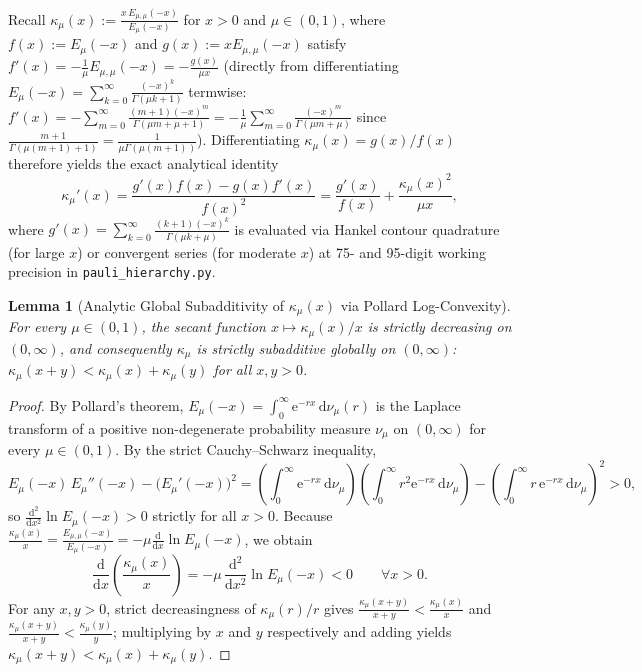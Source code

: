 \documentclass[onecolumn,10pt,notitlepage,amsmath,amssymb,floatfix]{revtex4-2}
\theoremstyle{plain}
\newtheorem{lemma}[theorem]{Lemma}
\theoremstyle{definition}
\newcommand{\dd}{\mathrm{d}}
\newcommand{\ee}{\mathrm{e}}
\begin{document}
Recall $\kappa_\mu(x) := \frac{x\,E_{\mu,\mu}(-x)}{E_\mu(-x)}$ for $x > 0$ and $\mu \in (0,1)$, where $f(x) := E_\mu(-x)$ and $g(x) := x E_{\mu,\mu}(-x)$ satisfy $f'(x) = -\frac{1}{\mu} E_{\mu,\mu}(-x) = -\frac{g(x)}{\mu x}$ (directly from differentiating $E_\mu(-x) = \sum_{k=0}^\infty \frac{(-x)^k}{\Gamma(\mu k+1)}$ termwise: $f'(x) = -\sum_{m=0}^\infty \frac{(m+1)(-x)^m}{\Gamma(\mu m + \mu + 1)} = -\frac{1}{\mu}\sum_{m=0}^\infty \frac{(-x)^m}{\Gamma(\mu m+\mu)}$ since $\frac{m+1}{\Gamma(\mu(m+1)+1)} = \frac{1}{\mu\Gamma(\mu(m+1))}$). Differentiating $\kappa_\mu(x) = g(x)/f(x)$ therefore yields the exact analytical identity
\begin{equation}
\label{eq:S4_kappa_prime}
\kappa_\mu'(x)
= \frac{g'(x)f(x) - g(x)f'(x)}{f(x)^2}
= \frac{g'(x)}{f(x)} + \frac{\kappa_\mu(x)^2}{\mu x},
\end{equation}
where $g'(x) = \sum_{k=0}^\infty \frac{(k+1)(-x)^k}{\Gamma(\mu k + \mu)}$ is evaluated via Hankel contour quadrature (for large $x$) or convergent series (for moderate $x$) at 75- and 95-digit working precision in \texttt{pauli\_hierarchy.py}.

\begin{lemma}[Analytic Global Subadditivity of $\kappa_\mu(x)$ via Pollard Log-Convexity]
\label{lem:S4_pollard_subadd}
For every $\mu \in (0,1)$, the secant function $x \mapsto \kappa_\mu(x)/x$ is strictly decreasing on $(0,\infty)$, and consequently $\kappa_\mu$ is strictly subadditive globally on $(0,\infty)$: $\kappa_\mu(x + y) < \kappa_\mu(x) + \kappa_\mu(y)$ for all $x, y > 0$.
\end{lemma}
\begin{proof}
By Pollard's theorem, $E_\mu(-x) = \int_0^\infty \ee^{-rx}\,\dd\nu_\mu(r)$ is the Laplace transform of a positive non-degenerate probability measure $\nu_\mu$ on $(0,\infty)$ for every $\mu \in (0,1)$. By the strict Cauchy--Schwarz inequality,
\[
E_\mu(-x)\,E_\mu''(-x) - \big(E_\mu'(-x)\big)^2
= \left(\int_0^\infty \ee^{-rx}\,\dd\nu_\mu\right)\!\left(\int_0^\infty r^2 \ee^{-rx}\,\dd\nu_\mu\right)
- \left(\int_0^\infty r\,\ee^{-rx}\,\dd\nu_\mu\right)^2 > 0,
\]
so $\frac{\dd^2}{\dd x^2}\ln E_\mu(-x) > 0$ strictly for all $x > 0$. Because $\frac{\kappa_\mu(x)}{x} = \frac{E_{\mu,\mu}(-x)}{E_\mu(-x)} = -\mu\frac{\dd}{\dd x}\ln E_\mu(-x)$, we obtain
\begin{equation}
\label{eq:S4_secant_neg}
\frac{\dd}{\dd x}\!\left(\frac{\kappa_\mu(x)}{x}\right)
= -\mu\,\frac{\dd^2}{\dd x^2}\ln E_\mu(-x) < 0 \qquad \forall x > 0.
\end{equation}
For any $x, y > 0$, strict decreasingness of $\kappa_\mu(r)/r$ gives $\frac{\kappa_\mu(x+y)}{x+y} < \frac{\kappa_\mu(x)}{x}$ and $\frac{\kappa_\mu(x+y)}{x+y} < \frac{\kappa_\mu(y)}{y}$; multiplying by $x$ and $y$ respectively and adding yields $\kappa_\mu(x+y) < \kappa_\mu(x) + \kappa_\mu(y)$.
\end{proof}
\end{document}
